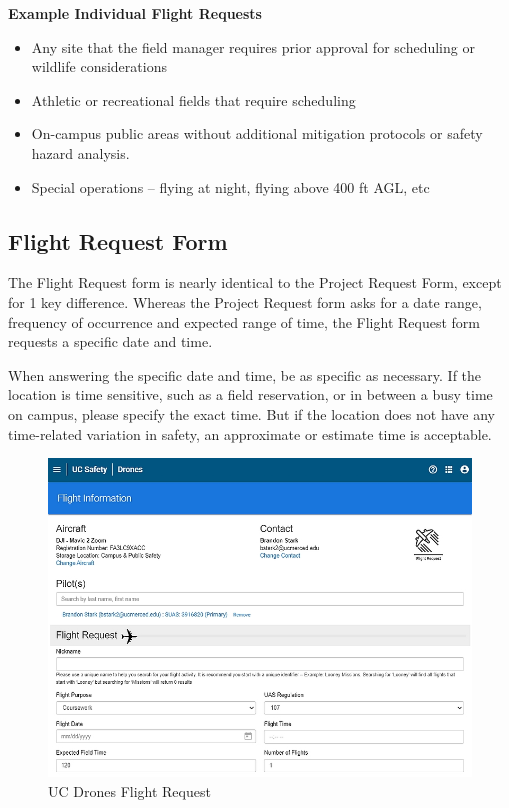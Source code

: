 \documentclass[
  12pt,
]{book}
\providecommand{\tightlist}{%
  \setlength{\itemsep}{0pt}\setlength{\parskip}{0pt}}
\begin{document}
\textbf{Example Individual Flight Requests}

\begin{itemize}
\tightlist
\item
  Any site that the field manager requires prior approval for scheduling or wildlife considerations
\item
  Athletic or recreational fields that require scheduling
\item
  On-campus public areas without additional mitigation protocols or safety hazard analysis.
\item
  Special operations -- flying at night, flying above 400 ft AGL, etc
\end{itemize}

\subsection{Flight Request Form}\label{flight-request-form}

The Flight Request form is nearly identical to the Project Request Form, except for 1 key difference. Whereas the Project Request form asks for a date range, frequency of occurrence and expected range of time, the Flight Request form requests a specific date and time.

When answering the specific date and time, be as specific as necessary. If the location is time sensitive, such as a field reservation, or in between a busy time on campus, please specify the exact time. But if the location does not have any time-related variation in safety, an approximate or estimate time is acceptable.

\begin{figure}

{\centering \includegraphics[width=0.85\linewidth]{images/UCDrones_flight_request} 

}

\caption{UC Drones Flight Request}\label{fig:UCDrones-flight-request}
\end{figure}
\end{document}
